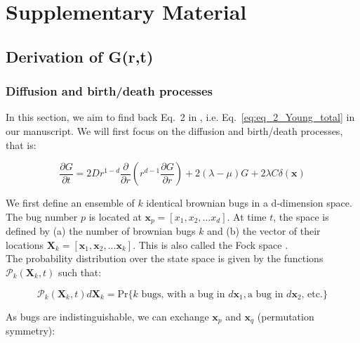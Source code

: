 \section*{Supplementary Material}

\subsection*{Derivation of G(r,t)}

\subsubsection*{Diffusion and birth/death processes}

In this section, we aim to find back Eq.~2 in \cite{young_reproductive_2001}, i.e. Eq.~\ref{eq:eq_2_Young_total} in our manuscript. We will first focus on the diffusion and birth/death processes, that is:

\begin{equation}
 \frac{\partial G}{\partial t}=2Dr^{1-d}\frac{\partial}{\partial r}\left(r^{d-1}\frac{\partial G}{\partial r}\right)+2(\lambda-\mu)G+2\lambda C\delta(\boldsymbol{x})\label{eq:eq_2_Young_diffusionbirth}
\end{equation}

\vspace{1.25em}

We first define an ensemble of $k$ identical brownian bugs in a d-dimension
space. The
bug number $p$ is located at $\boldsymbol{x}_{p}=[x_1,x_2,...x_{d}]$.
At time $t$, the space is defined by (a) the number of brownian
bugs $k$ and (b) the vector of their locations $\boldsymbol{X}_{k}=[\boldsymbol{x}_{1},\boldsymbol{x}_{2},...\boldsymbol{x}_{k}]$.
This is also called the Fock space \citep{birch_master_2006}. \\

The probability distribution over
the state space is given by the functions $\mathcal{P}_{k}(\boldsymbol{X}_{k},t)$
such that:

\begin{equation}
\mathcal{P}_{k}(\boldsymbol{X}_{k},t)d\boldsymbol{X}_{k}=\text{Pr}\{k\text{ bugs, with a bug in }d\boldsymbol{x}_{1},\text{a bug in }d\boldsymbol{x}_{2}\text{, etc.}\}
\end{equation}

\vspace{1.25em}

As bugs are indistinguishable, we can exchange $\boldsymbol{x}_{p}$
and $\boldsymbol{x}_{q}$ (permutation symmetry):

